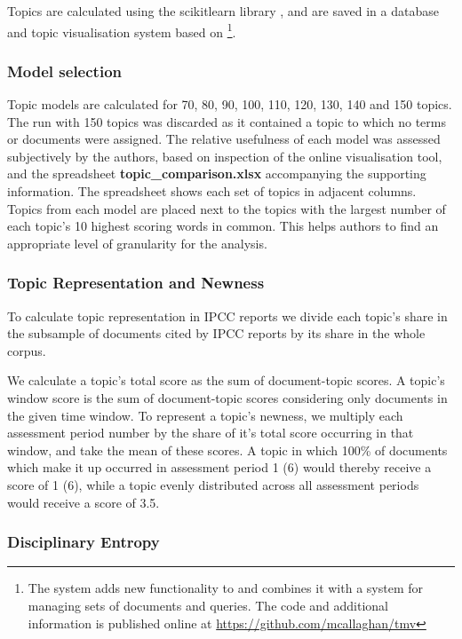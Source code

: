 \documentclass{article}
\begin{document}
\begin{linenumbers}
	Topics are calculated using the scikitlearn library \cite{Pedregosa2011}, and are saved in a database and topic visualisation system based on \cite{Chaney2012} \footnote{The system adds new functionality to \cite{Chaney2012} and combines it with a system for managing sets of documents and queries. The code and additional information is published online at \url{https://github.com/mcallaghan/tmv}}. 	
	
	\subsubsection*{Model selection}
	
	Topic models are calculated for 70, 80, 90, 100, 110, 120, 130, 140 and 150 topics. The run with 150 topics was discarded as it contained a topic to which no terms or documents were assigned. The relative usefulness of each model was assessed subjectively by the authors, based on inspection of the online visualisation tool, and the spreadsheet \textbf{topic\_comparison.xlsx} accompanying the supporting information. The spreadsheet shows each set of topics in adjacent columns. Topics from each model are placed next to the topics with the largest number of each topic's 10 highest scoring words in common. This helps authors to find an appropriate level of granularity for the analysis. 
			
	\subsubsection*{Topic Representation and Newness}
	
	To calculate topic representation in IPCC reports we divide each topic's share in the subsample of documents cited by IPCC reports by its share in the whole corpus. 
	
	We calculate a topic's total score as the sum of document-topic scores. A topic's window score is the sum of document-topic scores considering only documents in the given time window. To represent a topic's newness, we multiply each assessment period number by the share of it's total score occurring in that window, and take the mean of these scores. A topic in which 100\% of documents which make it up occurred in assessment period 1 (6) would thereby receive a score of 1 (6), while a topic evenly distributed across all assessment periods would receive a score of 3.5.
	
	
	\subsubsection*{Disciplinary Entropy}
	

\end{linenumbers}
\end{document}
